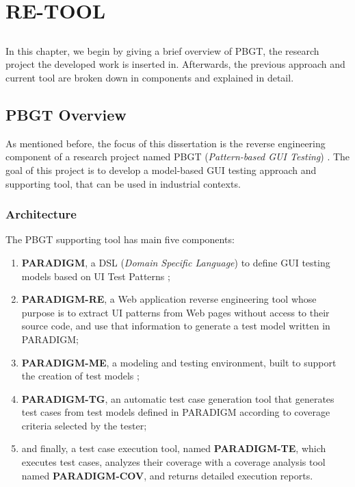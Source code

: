 \chapter{RE-TOOL}\label{chap:approach}

\section*{}


In this chapter, we begin by giving a brief overview of PBGT, the research project the developed work is inserted in. Afterwards, the previous approach and current tool are broken down in components and explained in detail.

\section{PBGT Overview}\label{sec:pbgt}

As mentioned before, the focus of this dissertation is the reverse engineering component of a research project named PBGT (\textit{Pattern-based GUI Testing}) \cite{moreira2013pattern}. The goal of this project is to develop a model-based GUI testing approach and supporting tool, that can be used in industrial contexts.\\

\subsection{Architecture}
The PBGT supporting tool has main five components: 
\begin{enumerate}
\item \textbf{PARADIGM}, a DSL (\textit{Domain Specific Language}) to define GUI testing models based on UI Test Patterns \cite{enase14}; 
\item \textbf{PARADIGM-RE}, a Web application reverse engineering tool whose purpose is to extract UI patterns from Web pages without access to their source code, and use that information to generate a test model written in PARADIGM; 
\item \textbf{PARADIGM-ME}, a modeling and testing environment, built to support the creation of test models \cite{conf_icst_MonteiroP13}; 
\item  \textbf{PARADIGM-TG}, an automatic test case generation tool that generates test cases from test models defined in PARADIGM according to coverage criteria selected by the tester; 
\item and finally, a test case execution tool, named \textbf{PARADIGM-TE}, which executes test cases, analyzes their coverage with a coverage analysis tool named \textbf{PARADIGM-COV}\cite{vilela2014cov}, and returns detailed execution reports. 
\end{enumerate}

